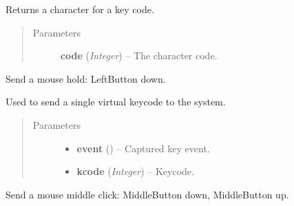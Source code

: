 \documentclass[letterpaper,10pt,english]{sphinxmanual}
\begin{document}

\begin{fulllineitems}
\label{macro:macro.GetSendkeys}
Returns a character for a key code.
\begin{quote}\begin{description}
\item[{Parameters}] \leavevmode
\textbf{code} (\emph{Integer}) -- The character code.

\end{description}\end{quote}

\end{fulllineitems}


\begin{fulllineitems}
\label{macro:macro.Hold}
Send a mouse hold: LeftButton down.

\end{fulllineitems}


\begin{fulllineitems}
\label{macro:macro.Key}
Used to send a single virtual keycode to the system.
\begin{quote}\begin{description}
\item[{Parameters}] \leavevmode\begin{itemize}
\item {} 
\textbf{event} () -- Captured key event.

\item {} 
\textbf{kcode} (\emph{Integer}) -- Keycode.

\end{itemize}

\end{description}\end{quote}

\end{fulllineitems}


\begin{fulllineitems}
\label{macro:macro.MiddleClick}
Send a mouse middle click: MiddleButton down, MiddleButton up.

\end{fulllineitems}
\end{document}

